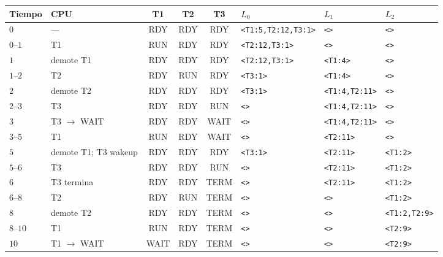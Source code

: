 \documentclass[11pt,a4paper]{article}
\begin{document}
\begin{center}
\scriptsize
\begin{tabular}{@{}llcccp{2.5cm}p{1.85cm}p{1.7cm}@{}}
\toprule
Tiempo & CPU & T1 & T2 & T3 & $L_0$ & $L_1$ & $L_2$ \\
\midrule
$0$       & ---            & RDY  & RDY  & RDY  & \texttt{<T1:5,T2:12,T3:1>} & \texttt{<>}        & \texttt{<>}      \\
$0$--$1$  & T1             & RUN  & RDY  & RDY  & \texttt{<T2:12,T3:1>}      & \texttt{<>}        & \texttt{<>}      \\
$1$       & demote T1      & RDY  & RDY  & RDY  & \texttt{<T2:12,T3:1>}      & \texttt{<T1:4>}    & \texttt{<>}      \\
$1$--$2$  & T2             & RDY  & RUN  & RDY  & \texttt{<T3:1>}            & \texttt{<T1:4>}    & \texttt{<>}      \\
$2$       & demote T2      & RDY  & RDY  & RDY  & \texttt{<T3:1>}            & \texttt{<T1:4,T2:11>} & \texttt{<>}   \\
$2$--$3$  & T3             & RDY  & RDY  & RUN  & \texttt{<>}                & \texttt{<T1:4,T2:11>} & \texttt{<>}   \\
$3$       & T3 $\to$ WAIT  & RDY  & RDY  & WAIT & \texttt{<>}                & \texttt{<T1:4,T2:11>} & \texttt{<>}   \\
$3$--$5$  & T1             & RUN  & RDY  & WAIT & \texttt{<>}                & \texttt{<T2:11>}   & \texttt{<>}      \\
$5$       & demote T1; T3 wakeup & RDY & RDY & RDY & \texttt{<T3:1>}          & \texttt{<T2:11>}   & \texttt{<T1:2>}  \\
$5$--$6$  & T3             & RDY  & RDY  & RUN  & \texttt{<>}                & \texttt{<T2:11>}   & \texttt{<T1:2>}  \\
$6$       & T3 termina     & RDY  & RDY  & TERM & \texttt{<>}                & \texttt{<T2:11>}   & \texttt{<T1:2>}  \\
$6$--$8$  & T2             & RDY  & RUN  & TERM & \texttt{<>}                & \texttt{<>}        & \texttt{<T1:2>}  \\
$8$       & demote T2      & RDY  & RDY  & TERM & \texttt{<>}                & \texttt{<>}        & \texttt{<T1:2,T2:9>} \\
$8$--$10$ & T1             & RUN  & RDY  & TERM & \texttt{<>}                & \texttt{<>}        & \texttt{<T2:9>}  \\
$10$      & T1 $\to$ WAIT  & WAIT & RDY  & TERM & \texttt{<>}                & \texttt{<>}        & \texttt{<T2:9>}  \\

\end{tabular}
\end{center}
\end{document}
